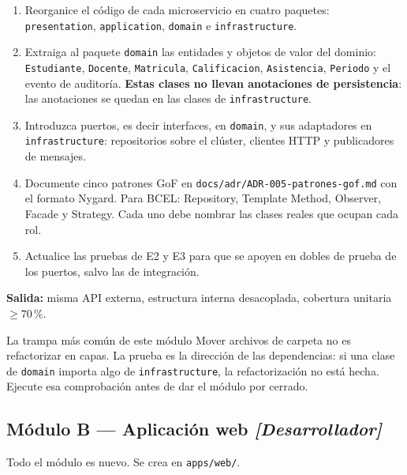 \documentclass[11pt,a4paper]{article}
\begin{document}
\begin{enumerate}[leftmargin=*,itemsep=3pt]
	\item Reorganice el código de cada microservicio en cuatro paquetes: \texttt{presentation}, \texttt{application}, \texttt{domain} e \texttt{infrastructure}.
	\item Extraiga al paquete \texttt{domain} las entidades y objetos de valor del dominio: \texttt{Estudiante}, \texttt{Docente}, \texttt{Matricula}, \texttt{Calificacion}, \texttt{Asistencia}, \texttt{Periodo} y el evento de auditoría. \textbf{Estas clases no llevan anotaciones de persistencia}: las anotaciones se quedan en las clases de \texttt{infrastructure}.
	\item Introduzca puertos, es decir interfaces, en \texttt{domain}, y sus adaptadores en \texttt{infrastructure}: repositorios sobre el clúster, clientes HTTP y publicadores de mensajes.
	\item Documente cinco patrones GoF en \texttt{docs/adr/ADR-005-\allowbreak patrones-gof.md} con el formato Nygard. Para BCEL: Repository, Template Method, Observer, Facade y Strategy. Cada uno debe nombrar las clases reales que ocupan cada rol.
	\item Actualice las pruebas de E2 y E3 para que se apoyen en dobles de prueba de los puertos, salvo las de integración.
\end{enumerate}

\textbf{Salida:} misma API externa, estructura interna desacoplada, cobertura unitaria $\geq 70\,\%$.

\begin{avisoBox}{La trampa más común de este módulo}
	Mover archivos de carpeta no es refactorizar en capas. La prueba es la dirección de las dependencias: si una clase de \texttt{domain} importa algo de \texttt{infrastructure}, la refactorización no está hecha. Ejecute esa comprobación antes de dar el módulo por cerrado.
\end{avisoBox}

\subsection{Módulo B --- Aplicación web \emph{[Desarrollador]}}

Todo el módulo es nuevo. Se crea en \texttt{apps/web/}.
\end{document}

